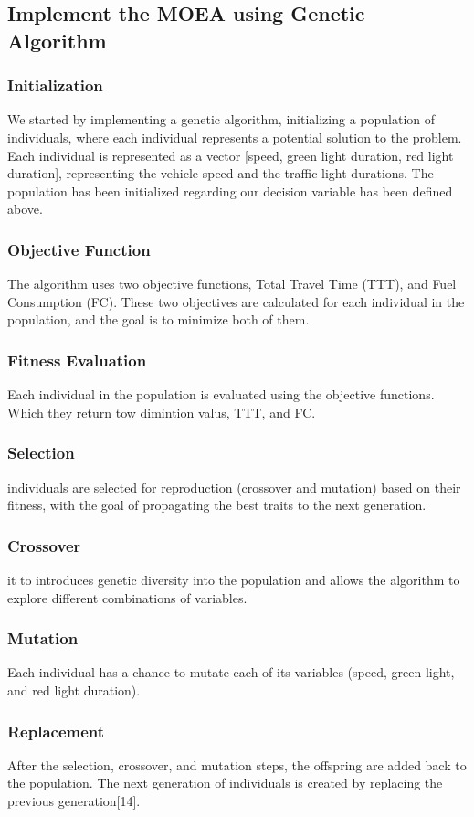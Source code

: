 \subsection{Implement the MOEA using Genetic Algorithm}
\subsubsection{Initialization}
We started by implementing a genetic algorithm, initializing a population of individuals, where each individual represents a potential solution to the problem. Each individual is represented as a vector [speed, green light duration, red light duration], representing the vehicle speed and the traffic light durations.
\newline
The population has been initialized regarding our decision variable has been defined above.
\subsubsection{Objective Function}
The algorithm uses two objective functions, Total Travel Time (TTT), and Fuel Consumption (FC). These two objectives are calculated for each individual in the population, and the goal is to minimize both of them.
\subsubsection{Fitness Evaluation}
Each individual in the population is evaluated using the objective functions. Which they return tow dimintion valus, TTT, and FC.
\subsubsection{Selection}
 individuals are selected for reproduction (crossover and mutation) based on their fitness, with the goal of propagating the best traits to the next generation.
 \subsubsection{Crossover}
 it to introduces genetic diversity into the population and allows the algorithm to explore different combinations of variables.
 \subsubsection{Mutation}
 Each individual has a chance to mutate each of its variables (speed, green light, and red light duration).
 \subsubsection{Replacement}
 After the selection, crossover, and mutation steps, the offspring are added back to the population. The next generation of individuals is created by replacing the previous generation[14].

